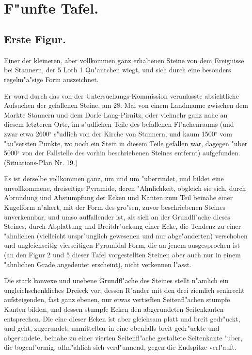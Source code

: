 \documentclass[a4paper, 11pt, oneside, german]{article}
\begin{document}
\section{F"unfte Tafel.}
\subsection{Erste Figur.}
\paragraph{}
Einer der kleineren, aber vollkommen ganz erhaltenen Steine von dem Ereignisse bei Stannern, der 5 Loth 1 Qu"antchen wiegt, und sich durch eine besonders regelm"a"sige Form auszeichnet.

Er ward durch das von der Untersuchungs-Kommission veranlasste absichtliche Aufsuchen der gefallenen Steine, am 28. Mai von einem Landmanne zwischen dem Markte Stannern und dem Dorfe Lang-Pirnitz, oder vielmehr ganz nahe an diesem letzteren Orte, im s"udlichen Teile des befallenen Fl"achenraums (und zwar etwa 2600$^{\circ}$ s"udlich von der Kirche von Stannern, und kaum 1500$^{\circ}$ vom "au"sersten Punkte, wo noch ein Stein in diesem Teile gefallen war, dagegen "uber 5000$^{\circ}$ von der Fallstelle des vorhin beschriebenen Steines entfernt) aufgefunden. (Situations-Plan Nr. 19.)

Es ist derselbe vollkommen ganz, um und um "uberrindet, und bildet eine unvollkommene, dreiseitige Pyramide, deren "Ahnlichkeit, obgleich sie sich, durch Abrundung und Abstumpfung der Ecken und Kanten zum Teil beinahe einer Kugelform n"ahert, mit der Form des gro"sen, zuvor beschriebenen Steines unverkennbar, und umso auffallender ist, als sich an der Grundfl"ache dieses Steines, durch Abplattung und Breitdr"uckung einer Ecke, die Tendenz zu einer "ahnlichen (vielleicht urspr"unglich gewesenen und nur abge"anderten) verschoben und ungleichseitig vierseitigen Pyramidal-Form, die an jenem ausgesprochen ist (an den Figur 2 und 5 dieser Tafel vorgestellten Steinen aber auch nur in einem "ahnlichen Grade angedeutet erscheint), nicht verkennen l"asst.

Die stark konvexe und unebene Grundfl"ache des Steines stellt n"amlich ein ungleichschenkliches Dreieck vor, dessen R"ander mit den drei ziemlich senkrecht aufsteigenden, fast ganz ebenen, nur etwas vertieften Seitenfl"achen stumpfe Kanten bilden, und dessen stumpfe Ecken den abgerundeten Seitenkanten entsprechen. Die eine dieser Ecken ist aber gleichsam platt und breit gedr"uckt, und geht, zugerundet, unmittelbar in eine ebenfalls breit gedr"uckte und abgerundete, beinahe zu einer vierten Seitenfl"ache gestaltete Seitenkante "uber, die bogenf"ormig, allm"ahlich sich verd"unnend, gegen die Endspitze verl"auft.
\end{document}
